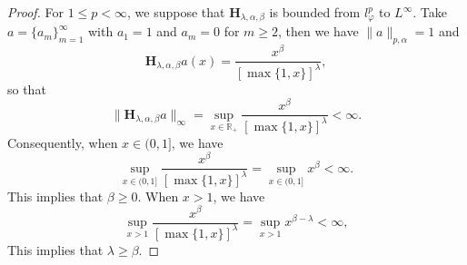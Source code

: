 \documentclass[10pt,a4paper]{amsart}
\begin{document}
\begin{proof}
For $1\leq p<\infty$, we suppose that  $\mathbf{H}_{\lambda, \alpha, \beta}$ is bounded from $l_{\varphi}^p$ to $L^{\infty}$. Take $a=\{a_m\}_{m=1}^{\infty}$ with $a_1=1$ and $a_m=0$ for $m\geq 2$, then we have
$\|a\|_{p,\alpha}=1$ and
\begin{equation}
\mathbf{H}_{\lambda, \alpha, \beta}a(x)=\frac{x^{\beta}}{[\max\{1,x\}]^{\lambda}},\nonumber 
\end{equation}   
so that \begin{equation}
\|\mathbf{H}_{\lambda, \alpha, \beta}a\|_{\infty}=\sup_{x\in \mathbb{R}_{+}}\frac{x^{\beta}}{[\max\{1,x\}]^{\lambda}}<\infty.\nonumber 
\end{equation} 
Consequently, when $x\in (0,1]$, we have $$\sup_{x\in (0,1]}\frac{x^{\beta}}{[\max\{1,x\}]^{\lambda}}=\sup_{x\in (0,1]}x^{\beta}<\infty.$$ This implies that $\beta\geq 0.$  When $x>1$, we have 
$$\sup_{x>1}\frac{x^{\beta}}{[\max\{1,x\}]^{\lambda}}=\sup_{x>1}x^{\beta-\lambda}<\infty,$$
This implies that $\lambda\geq \beta.$


\end{proof}
\end{document}
